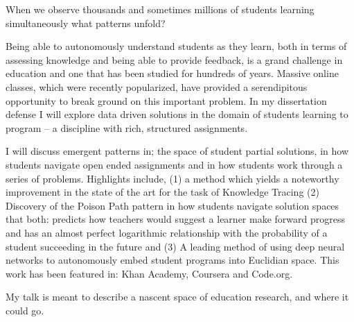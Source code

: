 When we observe thousands and sometimes millions of students learning simultaneously what patterns unfold?

Being able to autonomously understand students as they learn, both in terms of assessing knowledge and being able to provide feedback, is a grand challenge in education and one that has been studied for hundreds of years. Massive online classes, which were recently popularized, have provided a serendipitous opportunity to break ground on this important problem. In my dissertation defense I will explore data driven solutions in the domain of students learning to program -- a discipline with rich, structured assignments.

I will discuss emergent patterns in; the space of student partial solutions, in how students navigate open ended assignments and in how students work through a series of problems. Highlights include, (1) a method which yields a noteworthy improvement in the state of the art for the task of Knowledge Tracing (2) Discovery of the Poison Path pattern in how students navigate solution spaces that both: predicts how teachers would suggest a learner make forward progress and has an almost perfect logarithmic relationship with the probability of a student succeeding in the future and (3) A leading method of using deep neural networks to autonomously embed student programs into Euclidian space. This work has been featured in: Khan Academy, Coursera and Code.org.

My talk is meant to describe a nascent space of education research, and where it could go.